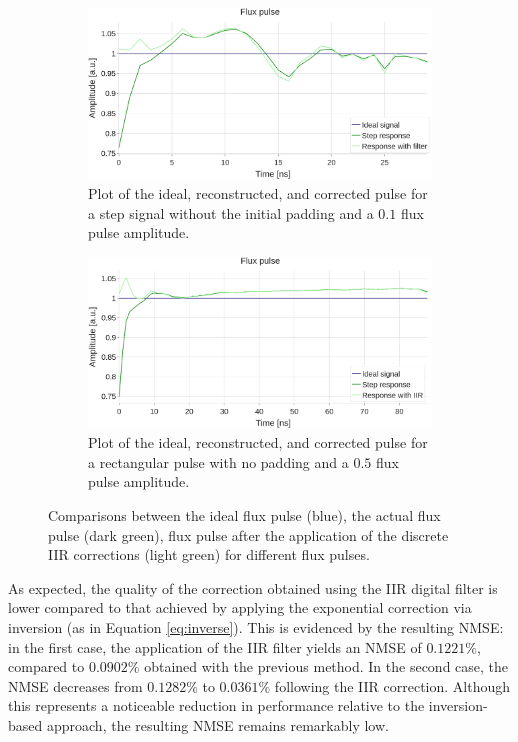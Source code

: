 \begin{figure}[h!]
    \centering
    \begin{subfigure}[t]{0.495\textwidth}
        \includegraphics[width=\textwidth]{figures/png/Cryoscope/filters/IIR_nopad.png}
        \caption{Plot of the ideal, reconstructed, and corrected pulse for a step signal without the initial padding and a $0.1$ flux pulse amplitude.}
        \label{fig:IIR:nopad}
    \end{subfigure}
    \hfill
    \begin{subfigure}[t]{0.495\textwidth}
        \includegraphics[width=\textwidth]{figures/png/Cryoscope/filters_long/IIR.png}
        \caption{Plot of the ideal, reconstructed, and corrected pulse for a rectangular pulse with no padding and a $0.5$ flux pulse amplitude.}
        \label{fig:IIR:long}
    \end{subfigure}
    \caption{Comparisons between the ideal flux pulse (blue), the actual flux pulse (dark green), flux pulse after the application of the discrete IIR corrections (light green) for different flux pulses.}
    \label{fig:IIR}
\end{figure}

As expected, the quality of the correction obtained using the IIR digital filter is lower compared to that achieved by applying the exponential correction via inversion (as in Equation \ref{eq:inverse}). 
This is evidenced by the resulting NMSE: in the first case, the application of the IIR filter yields an NMSE of $0.1221\%$, compared to $0.0902\%$ obtained with the previous method.
In the second case, the NMSE decreases from $0.1282\%$ to $0.0361\%$ following the IIR correction. 
Although this represents a noticeable reduction in performance relative to the inversion-based approach, the resulting NMSE remains remarkably low.

